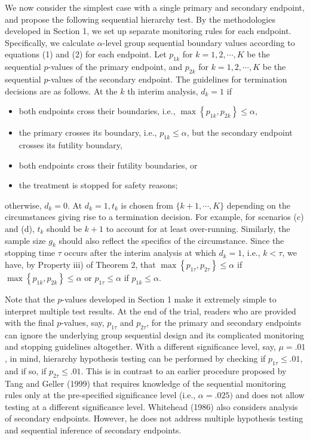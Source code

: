 \documentclass[10pt]{article}
\begin{document}
We now consider the simplest case with a single primary and secondary endpoint, and propose the following sequential hierarchy test. By the methodologies developed in Section 1, we set up separate monitoring rules for each endpoint. Specifically, we calculate $\alpha$-level group sequential boundary values according to equations (1) and (2) for each endpoint. Let $p_{1 k}$ for $k=1,2, \cdots, K$ be the sequential $p$-values of the primary endpoint, and $p_{2 k}$ for $k=1,2, \cdots, K$ be the sequential $p$-values of the secondary endpoint. The guidelines for termination decisions are as follows. At the $k$ th interim analysis, $d_{k}=1$ if

\begin{itemize}
  \item[(a)] both endpoints cross their boundaries, i.e., $\max \left\{p_{1 k}, p_{2 k}\right\} \leq \alpha$,
  \item[(b)] the primary crosses its boundary, i.e., $p_{1 k} \leq \alpha$, but the secondary endpoint crosses its futility boundary,
  \item[(c)] both endpoints cross their futility boundaries, or
  \item[(d)] the treatment is stopped for safety reasons;
\end{itemize}

otherwise, $d_{k}=0$. At $d_{k}=1, t_{k}$ is chosen from $\{k+1, \cdots, K\}$ depending on the circumstances giving rise to a termination decision. For example, for scenarios (c) and (d), $t_{k}$ should be $k+1$ to account for at least over-running. Similarly, the sample size $g_{k}$ should also reflect the specifics of the circumstance. Since the stopping time $\tau$ occurs after the interim analysis at which $d_{k}=1$, i.e., $k<\tau$, we have, by Property iii) of Theorem 2, that $\max \left\{p_{1 \tau}, p_{2 \tau}\right\} \leq \alpha$ if $\max \left\{p_{1 k}, p_{2 k}\right\} \leq \alpha$ or $p_{1 \tau} \leq \alpha$ if $p_{1 k} \leq \alpha$.

Note that the $p$-values developed in Section 1 make it extremely simple to interpret multiple test results. At the end of the trial, readers who are provided with the final $p$-values, say, $p_{1 \tau}$ and $p_{2 \tau}$, for the primary and secondary endpoints can ignore the underlying group sequential design and its complicated monitoring and stopping guidelines altogether. With a different significance level, say, $\mu=.01$, in mind, hierarchy hypothesis testing can be performed by checking if $p_{1 \tau} \leq .01$, and if so, if $p_{2 \tau} \leq .01$. This is in contrast to an earlier procedure proposed by Tang and Geller (1999) that requires knowledge of the sequential monitoring rules only at the pre-specified significance level (i.e., $\alpha=.025)$ and does not allow testing at a different significance level. Whitehead (1986) also considers analysis of secondary endpoints. However, he does not address multiple hypothesis testing and sequential inference of secondary endpoints.
\end{document}
